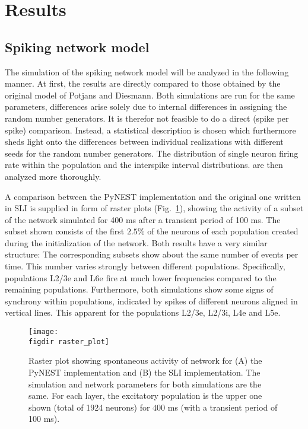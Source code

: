 \section{Results}
\label{sec:results}

\subsection{Spiking network model}
The simulation of the spiking network model will be analyzed in the following manner. 
At first, the results are directly compared to those obtained by the original 
model of Potjans and Diesmann. Both simulations are run for the same parameters, 
differences arise solely due to internal differences in assigning the random 
number generators. It is therefor not feasible to do a direct (spike per spike) 
comparison. Instead, a statistical description is chosen which furthermore sheds light
onto the differences between individual realizations with different seeds for the 
random number generators.
The distribution of single neuron firing rate within the population
and the interspike interval distributions.
are then analyzed more thoroughly. 

A comparison between the PyNEST implementation and the original one written in SLI
is supplied in form of raster plots (Fig.~\ref{fig:raster_plot}), 
showing the activity of a subset of the network simulated for 400 ms 
after a transient period of 100 ms. The subset shown consists of the first 
$2.5 \%$ of the neurons of each population created during the initialization of the network. 
Both results have a very similar structure: 
The corresponding subsets show about the same number of events per time. This 
number varies strongly between different populations. Specifically, populations L2/3e and L6e 
fire at much lower frequencies compared to the remaining populations. 
Furthermore, both simulations show some signs of synchrony within populations, indicated by spikes 
of different neurons aligned in vertical lines. This apparent for the populations L2/3e, L2/3i, L4e and 
L5e.
\begin{figure}[tb]
    \centering
    \texttt{[image: \\figdir raster\_plot]}
    \caption{Raster plot showing spontaneous activity of network for 
        (A) the PyNEST implementation and (B) the SLI implementation.
        The simulation and network parameters for both simulations are 
        the same. 
        For each layer, the excitatory population is the upper one shown 
        (total of 1924 neurons) for $400$ ms (with a transient period of 100 ms). 
    }
    \label{fig:raster_plot}
\end{figure}

